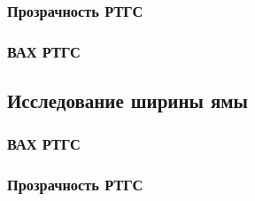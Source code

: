 \subsubsection{Прозрачность РТГС}
\subsubsection{ВАХ РТГС}

\subsection{Исследование ширины ямы}
\subsubsection{ВАХ РТГС}
\subsubsection{Прозрачность РТГС}